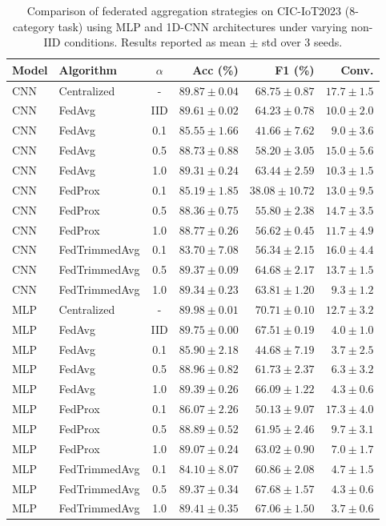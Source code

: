 \begin{table}
\caption{Comparison of federated aggregation strategies on CIC-IoT2023 (8-category task) using MLP and 1D-CNN architectures under varying non-IID conditions. Results reported as mean $\pm$ std over 3 seeds.}
\label{tab:fl_cic_iot_2023_results}
\begin{tabular}{llcrrr}
\toprule
Model & Algorithm & $\alpha$ & Acc (\%) & F1 (\%) & Conv. \\
\midrule
CNN & Centralized & - & $89.87 \pm 0.04$ & $68.75 \pm 0.87$ & $17.7 \pm 1.5$ \\
CNN & FedAvg & IID & $89.61 \pm 0.02$ & $64.23 \pm 0.78$ & $10.0 \pm 2.0$ \\
CNN & FedAvg & 0.1 & $85.55 \pm 1.66$ & $41.66 \pm 7.62$ & $9.0 \pm 3.6$ \\
CNN & FedAvg & 0.5 & $88.73 \pm 0.88$ & $58.20 \pm 3.05$ & $15.0 \pm 5.6$ \\
CNN & FedAvg & 1.0 & $89.31 \pm 0.24$ & $63.44 \pm 2.59$ & $10.3 \pm 1.5$ \\
CNN & FedProx & 0.1 & $85.19 \pm 1.85$ & $38.08 \pm 10.72$ & $13.0 \pm 9.5$ \\
CNN & FedProx & 0.5 & $88.36 \pm 0.75$ & $55.80 \pm 2.38$ & $14.7 \pm 3.5$ \\
CNN & FedProx & 1.0 & $88.77 \pm 0.26$ & $56.62 \pm 0.45$ & $11.7 \pm 4.9$ \\
CNN & FedTrimmedAvg & 0.1 & $83.70 \pm 7.08$ & $56.34 \pm 2.15$ & $16.0 \pm 4.4$ \\
CNN & FedTrimmedAvg & 0.5 & $89.37 \pm 0.09$ & $64.68 \pm 2.17$ & $13.7 \pm 1.5$ \\
CNN & FedTrimmedAvg & 1.0 & $89.34 \pm 0.23$ & $63.81 \pm 1.20$ & $9.3 \pm 1.2$ \\
MLP & Centralized & - & $89.98 \pm 0.01$ & $70.71 \pm 0.10$ & $12.7 \pm 3.2$ \\
MLP & FedAvg & IID & $89.75 \pm 0.00$ & $67.51 \pm 0.19$ & $4.0 \pm 1.0$ \\
MLP & FedAvg & 0.1 & $85.90 \pm 2.18$ & $44.68 \pm 7.19$ & $3.7 \pm 2.5$ \\
MLP & FedAvg & 0.5 & $88.96 \pm 0.82$ & $61.73 \pm 2.37$ & $6.3 \pm 3.2$ \\
MLP & FedAvg & 1.0 & $89.39 \pm 0.26$ & $66.09 \pm 1.22$ & $4.3 \pm 0.6$ \\
MLP & FedProx & 0.1 & $86.07 \pm 2.26$ & $50.13 \pm 9.07$ & $17.3 \pm 4.0$ \\
MLP & FedProx & 0.5 & $88.89 \pm 0.52$ & $61.95 \pm 2.46$ & $9.7 \pm 3.1$ \\
MLP & FedProx & 1.0 & $89.07 \pm 0.24$ & $63.02 \pm 0.90$ & $7.0 \pm 1.7$ \\
MLP & FedTrimmedAvg & 0.1 & $84.10 \pm 8.07$ & $60.86 \pm 2.08$ & $4.7 \pm 1.5$ \\
MLP & FedTrimmedAvg & 0.5 & $89.37 \pm 0.34$ & $67.68 \pm 1.57$ & $4.3 \pm 0.6$ \\
MLP & FedTrimmedAvg & 1.0 & $89.41 \pm 0.35$ & $67.06 \pm 1.50$ & $3.7 \pm 0.6$ \\
\bottomrule
\end{tabular}
\end{table}
